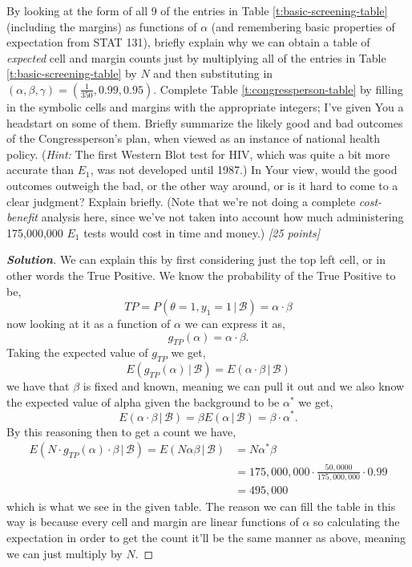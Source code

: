 \documentclass[12pt]{article}
\newcommand{\given}{\, | \,}
\newenvironment{solution}{\begin{proof}[\textbf{\textit{Solution}}] }{\end{proof}}
\begin{document}
\begin{itemize}
\begin{itemize}
By looking at the form of all 9 of the entries in Table \ref{t:basic-screening-table} (including the margins) as functions of $\alpha$ (and remembering basic properties of expectation from STAT 131), briefly explain why we can obtain a table of \textit{expected} cell and margin counts just by multiplying all of the entries in Table \ref{t:basic-screening-table} by $N$ and then substituting in $( \alpha, \beta, \gamma ) = \left( \frac{ 1 }{ 350 }, 0.99, 0.95 \right)$. Complete Table \ref{t:congressperson-table} by filling in the symbolic cells and margins with the appropriate integers; I've given You a headstart on some of them. Briefly summarize the likely good and bad outcomes of the Congressperson's plan, when viewed as an instance of national health policy. (\textit{Hint:} The first Western Blot test for HIV, which was quite a bit more accurate than $E_1$, was not developed until 1987.) In Your view, would the good outcomes outweigh the bad, or the other way around, or is it hard to come to a clear judgment? Explain briefly. (Note that we're not doing a complete \textit{cost-benefit} analysis here, since we've not taken into account how much administering 175,000,000 $E_1$ tests would cost in time and money.) \textit{[25 points]}

\begin{tcolorbox}[breakable]
    \begin{solution}
        We can explain this by first considering just the top left cell, or in other words the True Positive. We know the probability of the True Positive to be,
        \[TP = P(\theta =1 , y_1 = 1 \given \mathcal{B}) = \alpha \cdot \beta\]
        now looking at it as a function of $\alpha$ we can express it as,
        \[g_{TP}(\alpha) = \alpha\cdot \beta.\]
        Taking the expected value of $g_{TP}$ we get,
        \[E\left(g_{TP}(\alpha)\given \mathcal{B}\right) = E(\alpha \cdot \beta \given \mathcal{B})\]
        we have that $\beta$ is fixed and known, meaning we can pull it out and we also know the expected value of alpha given the background to be $\alpha^{*}$ we get,
        \[E(\alpha\cdot\beta \given \mathcal{B}) = \beta E(\alpha \given \mathcal{B}) =\beta \cdot \alpha^{*}. \]
        By this reasoning then to get a count we have,
        \begin{align*}
            E(N\cdot g_{TP}(\alpha) \cdot \beta\given\mathcal{B}) = E(N\alpha\beta \given \mathcal{B}) &= N\alpha^{*}\beta \\
            &= 175,000,000\cdot\frac{50,0000}{175,000,000}\cdot 0.99 \\
            &=495,000
        \end{align*}
        which is what we see in the given table. The reason we can fill the table in this way is because every cell and margin are linear functions of $\alpha$ so calculating the expectation in order to get the count it'll be the same manner as above, meaning we can just multiply by $N$.
       

\end{solution}
\end{tcolorbox}
\end{itemize}
\end{itemize}
\end{document}
